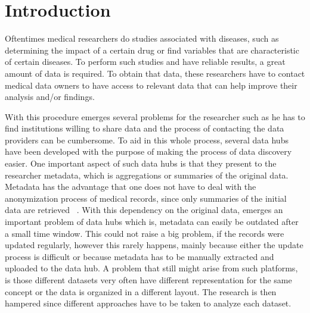 \chapter{Introduction}
\label{chapter:introduction}

Oftentimes medical researchers do studies associated with diseases, such as determining the impact of a certain drug or find variables that are characteristic of certain diseases.
To perform such studies and have reliable results, a great amount of data is required.
To obtain that data, these researchers have to contact medical data owners to have access to relevant data that can help improve their analysis and/or findings.

With this procedure emerges several problems for the researcher such as he has to find institutions willing to share data and the process of contacting the data providers can be cumbersome.
To aid in this whole process, several data hubs have been developed with the purpose of making the process of data discovery easier.
One important aspect of such data hubs is that they present to the researcher metadata, which is aggregations or summaries of the original data.
Metadata has the advantage that one does not have to deal with the anonymization process of medical records, since only summaries of the initial data are retrieved ~\cite{egenvar, montra}.
With this dependency on the original data, emerges an important problem of data hubs which is, metadata can easily be outdated after a small time window.
This could not raise a big problem, if the records were updated regularly, however this rarely happens, mainly because either the update process is difficult or because metadata has to be manually extracted and uploaded to the data hub.
A problem that still might arise from such platforms, is those different datasets very often have different representation for the same concept or the data is organized in a different layout.
The research is then hampered since different approaches have to be taken to analyze each dataset.

